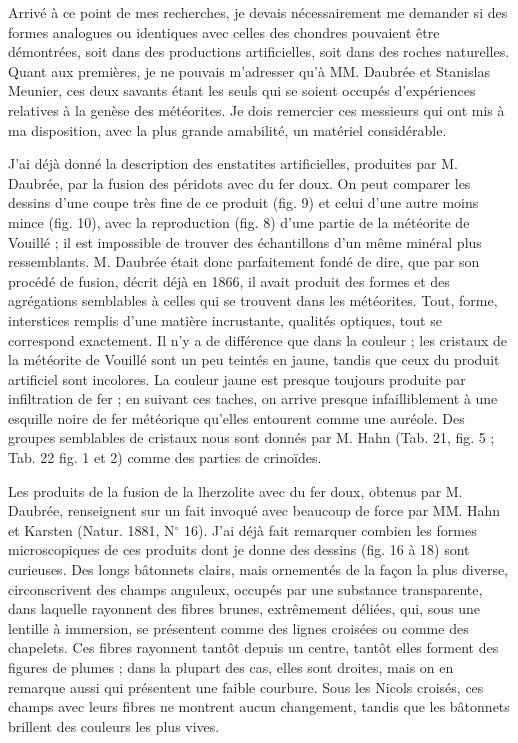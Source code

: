 \documentclass[a4paper, 12pt, oneside, french]{article}
\begin{document}
Arrivé à ce point de mes recherches, je devais nécessairement me demander si des formes analogues ou identiques avec celles des chondres pouvaient être démontrées, soit dans des productions artificielles, soit dans des roches naturelles. Quant aux premières, je ne pouvais m'adresser qu'à MM. Daubrée et Stanislas Meunier, ces deux savants étant les seuls qui se soient occupés d'expériences relatives à la genèse des météorites. Je dois remercier ces messieurs qui ont mis à ma disposition, avec la plus grande amabilité, un matériel considérable.

J'ai déjà donné la description des enstatites artificielles, produites par M. Daubrée, par la fusion des péridots avec du fer doux. On peut comparer les dessins d'une coupe très fine de ce produit (fig. 9) et celui d'une autre moins mince (fig. 10), avec la reproduction (fig. 8) d'une partie de la météorite de Vouillé ; il est impossible de trouver des échantillons d'un même minéral plus ressemblants. M. Daubrée était donc parfaitement fondé de dire, que par son procédé de fusion, décrit déjà en 1866, il avait produit des formes et des agrégations semblables à celles qui se trouvent dans les météorites. Tout, forme, interstices remplis d'une matière incrustante, qualités optiques, tout se correspond exactement. Il n'y a de différence que dans la couleur ; les cristaux de la météorite de Vouillé sont un peu teintés en jaune, tandis que ceux du produit artificiel sont incolores. La couleur jaune est presque toujours produite par infiltration de fer ; en suivant ces taches, on arrive presque infailliblement à une esquille noire de fer météorique qu'elles entourent comme une auréole. Des groupes semblables de cristaux nous sont donnés par M. Hahn (Tab. 21, fig. 5 ; Tab. 22 fig. 1 et 2) comme des parties de crinoïdes.

Les produits de la fusion de la lherzolite avec du fer doux, obtenus par M. Daubrée, renseignent sur un fait invoqué avec beaucoup de force par MM. Hahn et Karsten (Natur. 1881, N$^{\circ}$ 16). J'ai déjà fait remarquer combien les formes microscopiques de ces produits dont je donne des dessins (fig. 16 à 18) sont curieuses. Des longs bâtonnets clairs, mais ornementés de la façon la plus diverse, circonscrivent des champs anguleux, occupés par une substance transparente, dans laquelle rayonnent des fibres brunes, extrêmement déliées, qui, sous une lentille à immersion, se présentent comme des lignes croisées ou comme des chapelets. Ces fibres rayonnent tantôt depuis un centre, tantôt elles forment des figures de plumes ; dans la plupart des cas, elles sont droites, mais on en remarque aussi qui présentent une faible courbure. Sous les Nicols croisés, ces champs avec leurs fibres ne montrent aucun changement, tandis que les bâtonnets brillent des couleurs les plus vives.
\end{document}
